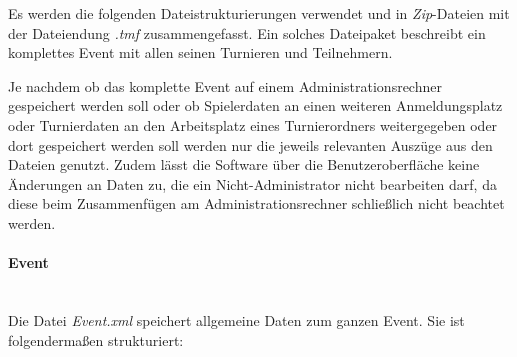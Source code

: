 \documentclass[11pt]{article}
\newcommand{\subsubsubsection}[1]{\paragraph{#1}\mbox{}\\}
\begin{document}
Es werden die folgenden Dateistrukturierungen verwendet und in \textit{Zip}-Dateien mit der Dateiendung \textit{.tmf} zusammengefasst. Ein solches Dateipaket beschreibt ein komplettes Event mit allen seinen Turnieren und Teilnehmern.

Je nachdem ob das komplette Event auf einem Administrationsrechner gespeichert werden soll oder ob Spielerdaten an einen weiteren Anmeldungsplatz oder Turnierdaten an den Arbeitsplatz eines Turnierordners weitergegeben oder dort gespeichert werden soll werden nur die jeweils relevanten Auszüge aus den Dateien genutzt. Zudem lässt die Software über die Benutzeroberfläche keine Änderungen an Daten zu, die ein Nicht-Administrator nicht bearbeiten darf, da diese beim Zusammenfügen am Administrationsrechner schließlich nicht beachtet werden.

\subsubsubsection{Event}

Die Datei \textit{Event.xml} speichert allgemeine Daten zum ganzen Event. Sie ist folgendermaßen strukturiert:
\vspace{0.4cm}

\end{document}
